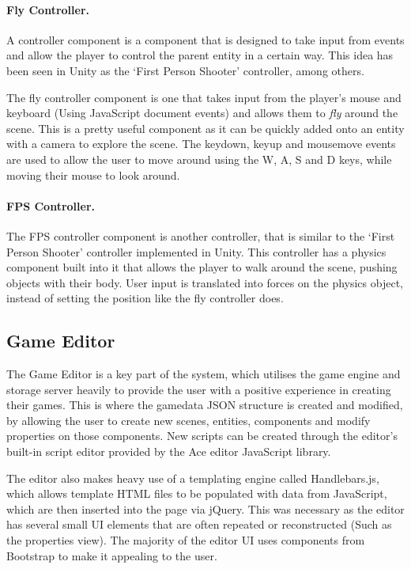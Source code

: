 	\paragraph{Fly Controller.}
	A controller component is a component that is designed to take input from events and allow the player to control the parent entity in a certain way. This idea has been seen in Unity as the `First Person Shooter' controller, among others.

	The fly controller component is one that takes input from the player's mouse and keyboard (Using JavaScript document events) and allows them to \emph{fly} around the scene. This is a pretty useful component as it can be quickly added onto an entity with a camera to explore the scene. The keydown, keyup and mousemove events are used to allow the user to move around using the W, A, S and D keys, while moving their mouse to look around.

	\paragraph{FPS Controller.}
	The FPS controller component is another controller, that is similar to the `First Person Shooter' controller implemented in Unity. This controller has a physics component built into it that allows the player to walk around the scene, pushing  objects with their body. User input is translated into forces on the physics object, instead of setting the position like the fly controller does.

	\subsection{Game Editor}
	\label{subsection:gameeditor}
	The Game Editor is a key part of the system, which utilises the game engine and storage server heavily to provide the user with a positive experience in creating their games. This is where the gamedata JSON structure is created and modified, by allowing the user to create new scenes, entities, components and modify properties on those components. New scripts can be created through the editor's built-in script editor provided by the Ace editor JavaScript library.

	The editor also makes heavy use of a templating engine called Handlebars.js, which allows template HTML files to be populated with data from JavaScript, which are then inserted into the page via jQuery. This was necessary as the editor has several small UI elements that are often repeated or reconstructed (Such as the properties view). The majority of the editor UI uses components from Bootstrap to make it appealing to the user.
	

